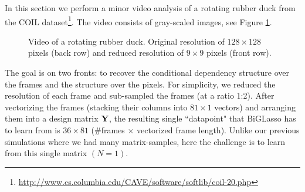     In this section we perform a minor video analysis of a rotating rubber duck from the COIL dataset\footnote{\url{http://www.cs.columbia.edu/CAVE/software/softlib/coil-20.php}}.
    The video consists of gray-scaled images, see Figure \ref{fig:rotating_duck}.
    \begin{figure}[!htbp]
      \centering
       \quad
      \caption[Video of a rotating rubber duck.]{ \label{fig:rotating_duck} Video of a rotating rubber duck. Original resolution of $128 \times 128$ pixels (back row) and reduced resolution of $9 \times 9$ pixels (front row).}
    \end{figure}
    The goal is on two fronts: to recover the conditional dependency structure over the frames and the structure over the pixels.    
    For simplicity, we reduced the resolution of each frame and sub-sampled the frames (at a ratio 1:2).
    After vectorizing the frames (stacking their columns into $81 \times 1$ vectors) and arranging them into a design matrix $\mathbf{Y}$, the resulting single ``datapoint" that BiGLasso has to learn from is $36\times 81$ (\#frames $\times$ vectorized frame length).
    Unlike our previous simulations where we had many matrix-samples, here the challenge is to learn from this single matrix $(N = 1)$.
    

